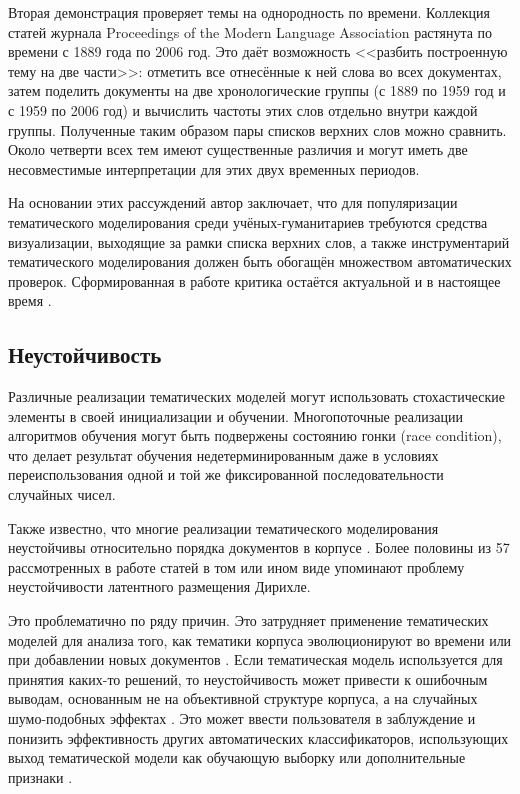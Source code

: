Вторая демонстрация проверяет темы на однородность по времени. Коллекция статей журнала Proceedings of the Modern Language Association растянута по времени с 1889 года по 2006 год. Это даёт возможность <<разбить построенную тему на две части>>: отметить все отнесённые к ней слова во всех документах, затем поделить документы на две хронологические группы (с 1889 по 1959 год и с 1959 по 2006 год) и вычислить частоты этих слов отдельно внутри каждой группы. Полученные таким образом пары списков верхних слов можно сравнить. Около четверти всех тем имеют существенные различия и могут иметь две несовместимые интерпретации для этих двух временных периодов. 

На основании этих рассуждений автор заключает, что для популяризации тематического моделирования среди учёных-гуманитариев требуются средства визуализации, выходящие за рамки списка верхних слов, а также инструментарий тематического моделирования должен быть обогащён множеством автоматических проверок. Сформированная в работе критика остаётся актуальной и в настоящее время \cite{paakkonen2020humanistic}. 

\subsection{Неустойчивость}

Различные реализации тематических моделей могут использовать стохастические элементы в своей инициализации и обучении. Многопоточные реализации алгоритмов обучения могут быть подвержены состоянию гонки (race condition), что делает результат обучения недетерминированным даже в условиях переиспользования одной и той же фиксированной последовательности случайных чисел.

Также известно, что многие реализации тематического моделирования неустойчивы относительно порядка документов в корпусе \cite{agrawal2018wrong}. Более половины из 57 рассмотренных в работе \cite{agrawal2018wrong} статей в том или ином виде упоминают проблему неустойчивости латентного размещения Дирихле.

Это проблематично по ряду причин. Это затрудняет применение тематических моделей для анализа того, как тематики корпуса эволюционируют во времени или при добавлении новых документов \cite{mehta_clustering_bank}. Если тематическая модель используется для принятия каких-то решений, то неустойчивость может привести к ошибочным выводам, основанным не на объективной структуре корпуса, а на случайных шумо-подобных эффектах \cite{mantyla2018measuring}. Это может ввести пользователя в заблуждение и понизить эффективность других автоматических классификаторов, использующих выход тематической модели как обучающую выборку или дополнительные признаки \cite{agrawal2018wrong}.

